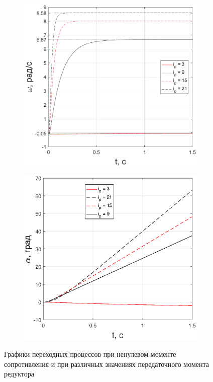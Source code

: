 \documentclass[fleqn, a4paper, 11pt, russian]{article}
\begin{document}
\begin{figure}[ht!]
\begin{subfigure}[b]{0.48\textwidth}
		\end{subfigure}
	\end{figure}
	\begin{figure}[ht!]\ContinuedFloat
		\centering
		\begin{subfigure}[b]{0.48\textwidth}
			\includegraphics[width = \textwidth]{ivar/eps/ivarM44Omega}
		\end{subfigure}
		\hfill
		\begin{subfigure}[b]{0.48\textwidth}
			\includegraphics[width = \textwidth]{ivar/eps/ivarM44Alpha}
		\end{subfigure}
		\caption{Графики переходных процессов при ненулевом моменте сопротивления и при различных значениях передаточного момента редуктора}
		\label{M44ivar}
	\end{figure}
\end{document}
